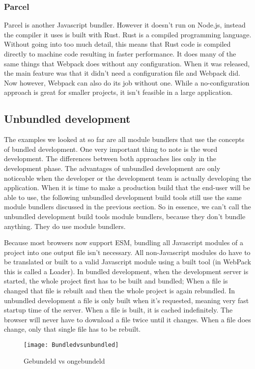 \subsubsection{Parcel}

Parcel is another Javascript bundler. However it doesn’t run on Node.js, instead the compiler it uses is built with Rust. Rust is a compiled programming language. Without going into too much detail, this means that Rust code is compiled directly to machine code resulting in faster performance. It does many of the same things that Webpack does without any configuration. When it was released, the main feature was that it didn’t need a configuration file and Webpack did. Now however, Webpack can also do its job without one. While a no-configuration approach is great for smaller projects, it isn’t feasible in a large application. 

\subsection{Unbundled development}

The examples we looked at so far are all module bundlers that use the concepts of bundled development. One very important thing to note is the word development. The differences between both approaches lies only in the development phase. The advantages of unbundled development are only noticeable when the developer or the development team is actually developing the application. When it is time to make a production build that the end-user will be able to use, the following unbundled development build tools still use the same module bundlers discussed in the previous section. So in essence, we can’t call the unbundled development build tools module bundlers, because they don’t bundle anything. They do use module bundlers.

Because most browsers now support ESM, bundling all Javascript modules of a project into one output file isn’t necessary. All non-Javascript modules do have to be translated or built to a valid Javascript module using a built tool (in WebPack this is called a Loader). In bundled development, when the development server is started, the whole project first has to be built and bundled; When a file is changed that file is rebuilt and then the whole project is again rebundled. In unbundled development a file is only built when it’s requested, meaning very fast startup time of the server. When a file is built, it is cached indefinitely. The browser will never have to download a file twice until it changes. When a file does change, only that single file has to be rebuilt. 
\begin{figure}[h]
\texttt{[image: Bundledvsunbundled]}
    \caption{Gebundeld vs ongebundeld \autocite{snowpack-no-date}}
\end{figure}

